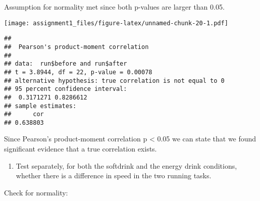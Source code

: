 \documentclass[
]{article}
\newenvironment{Shaded}{\begin{snugshade}}{\end{snugshade}}
\newcommand{\AttributeTok}[1]{\textcolor[rgb]{0.77,0.63,0.00}{#1}}
\newcommand{\CommentTok}[1]{\textcolor[rgb]{0.56,0.35,0.01}{\textit{#1}}}
\newcommand{\FunctionTok}[1]{\textcolor[rgb]{0.00,0.00,0.00}{#1}}
\newcommand{\NormalTok}[1]{#1}
\newcommand{\SpecialCharTok}[1]{\textcolor[rgb]{0.00,0.00,0.00}{#1}}
\newcommand{\StringTok}[1]{\textcolor[rgb]{0.31,0.60,0.02}{#1}}
\providecommand{\tightlist}{%
  \setlength{\itemsep}{0pt}\setlength{\parskip}{0pt}}
\begin{document}
Assumption for normality met since both p-values are larger than 0.05.

\begin{Shaded}
\end{Shaded}

\texttt{[image: assignment1\_files/figure-latex/unnamed-chunk-20-1.pdf]}

\begin{Shaded}
\end{Shaded}

\begin{verbatim}
## 
##  Pearson's product-moment correlation
## 
## data:  run$before and run$after
## t = 3.8944, df = 22, p-value = 0.00078
## alternative hypothesis: true correlation is not equal to 0
## 95 percent confidence interval:
##  0.3171271 0.8286612
## sample estimates:
##      cor 
## 0.638803
\end{verbatim}

Since Pearson's product-moment correlation p \textless{} 0.05 we can
state that we found significant evidence that a true correlation exists.

\begin{enumerate}
\def\labelenumi{\alph{enumi})}
\setcounter{enumi}{1}
\tightlist
\item
  Test separately, for both the softdrink and the energy drink
  conditions, whether there is a difference in speed in the two running
  tasks.
\end{enumerate}

Check for normality:

\begin{Shaded}
\end{Shaded}
\end{document}
